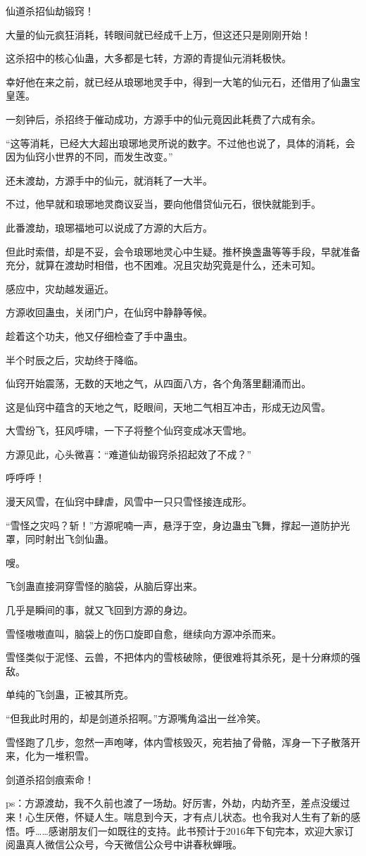 \begin{this_body}
仙道杀招仙劫锻窍！

大量的仙元疯狂消耗，转眼间就已经成千上万，但这还只是刚刚开始！

这杀招中的核心仙蛊，大多都是七转，方源的青提仙元消耗极快。

幸好他在来之前，就已经从琅琊地灵手中，得到一大笔的仙元石，还借用了仙蛊宝皇莲。

一刻钟后，杀招终于催动成功，方源手中的仙元竟因此耗费了六成有余。

“这等消耗，已经大大超出琅琊地灵所说的数字。不过他也说了，具体的消耗，会因为仙窍小世界的不同，而发生改变。”

还未渡劫，方源手中的仙元，就消耗了一大半。

不过，他早就和琅琊地灵商议妥当，要向他借贷仙元石，很快就能到手。

此番渡劫，琅琊福地可以说成了方源的大后方。

但此时索借，却是不妥，会令琅琊地灵心中生疑。推杯换盏蛊等等手段，早就准备充分，就算在渡劫时相借，也不困难。况且灾劫究竟是什么，还未可知。

感应中，灾劫越发逼近。

方源收回蛊虫，关闭门户，在仙窍中静静等候。

趁着这个功夫，他又仔细检查了手中蛊虫。

半个时辰之后，灾劫终于降临。

仙窍开始震荡，无数的天地之气，从四面八方，各个角落里翻涌而出。

这是仙窍中蕴含的天地之气，眨眼间，天地二气相互冲击，形成无边风雪。

大雪纷飞，狂风呼啸，一下子将整个仙窍变成冰天雪地。

方源见此，心头微喜：“难道仙劫锻窍杀招起效了不成？”

呼呼呼！

漫天风雪，在仙窍中肆虐，风雪中一只只雪怪接连成形。

“雪怪之灾吗？斩！”方源呢喃一声，悬浮于空，身边蛊虫飞舞，撑起一道防护光罩，同时射出飞剑仙蛊。

嗖。

飞剑蛊直接洞穿雪怪的脑袋，从脑后穿出来。

几乎是瞬间的事，就又飞回到方源的身边。

雪怪嗷嗷直叫，脑袋上的伤口旋即自愈，继续向方源冲杀而来。

雪怪类似于泥怪、云兽，不把体内的雪核破除，便很难将其杀死，是十分麻烦的强敌。

单纯的飞剑蛊，正被其所克。

“但我此时用的，却是剑道杀招啊。”方源嘴角溢出一丝冷笑。

雪怪跑了几步，忽然一声咆哮，体内雪核毁灭，宛若抽了骨骼，浑身一下子散落开来，化为一堆积雪。

剑道杀招剑痕索命！

ps：方源渡劫，我不久前也渡了一场劫。好厉害，外劫，内劫齐至，差点没缓过来！心生厌倦，怀疑人生。喘息到今天，才有点儿状态。也令我对人生有了新的感悟。呼……感谢朋友们一如既往的支持。此书预计于2016年下旬完本，欢迎大家订阅蛊真人微信公众号，今天微信公众号中讲春秋蝉哦。

\end{this_body}


